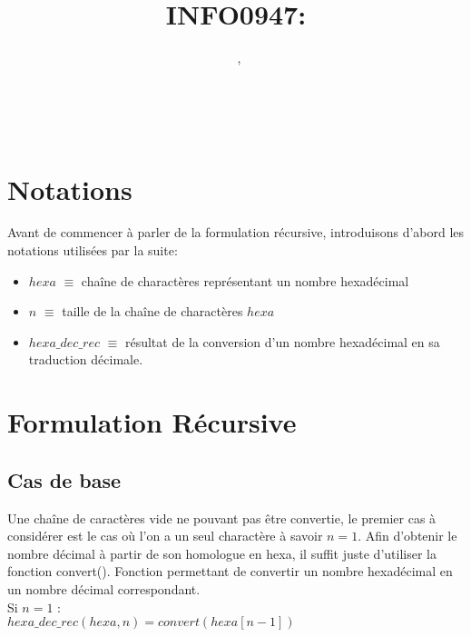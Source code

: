 \documentclass[a4paper, 11pt, oneside]{article}
\title{INFO0947: \intitule}
\author{\textsc{\Prenom}~\textsc{\Nom}, \matricule}
\date{}
\newcommand{\tablemat}{~}
\begin{document}
\maketitle
\newpage
\tablemat
\newpage


\section{Notations}

Avant de commencer à parler de la formulation récursive, introduisons d'abord les notations utilisées par la suite:\\

\begin{itemize}
    \item $hexa$ $\equiv$ chaîne de charactères représentant un nombre hexadécimal
    \item $n$ $\equiv$ taille de la chaîne de charactères $hexa$
    \item $hexa\_dec\_rec$ $\equiv$ résultat de la conversion d'un nombre hexadécimal en sa traduction décimale.
\end{itemize}

\section{Formulation Récursive}\label{formulation}
%
%

\subsection{Cas de base}

Une chaîne de caractères vide ne pouvant pas  être convertie, le premier cas à considérer est le cas où l'on a un seul charactère à savoir $n = 1$. Afin d'obtenir le nombre décimal à partir de son homologue en hexa, il suffit juste d'utiliser la fonction convert(). Fonction permettant de convertir un nombre hexadécimal en un nombre décimal correspondant.\\

Si $n = 1$ :\\

$hexa\_dec\_rec(hexa, n) = convert(hexa[n - 1])$\\
\end{document}
